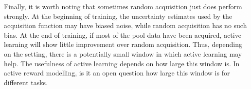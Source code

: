 \documentclass[11pt, a4paper, bibliography=totoc]{report}
\begin{document}
Finally, it is worth noting that sometimes random acquisition just does perform strongly. At the beginning of training, the uncertainty estimates used by the acquisition function may have biased noise, while random acquisition has no such bias. At the end of training, if most of the pool data have been acquired, active learning will show little improvement over random acquisition. Thus, depending on the setting, there is a potentially small window in which active learning may help. The usefulness of active learning depends on how large this window is. In active reward modelling, is it an open question how large this window is for different tasks.
\end{document}
